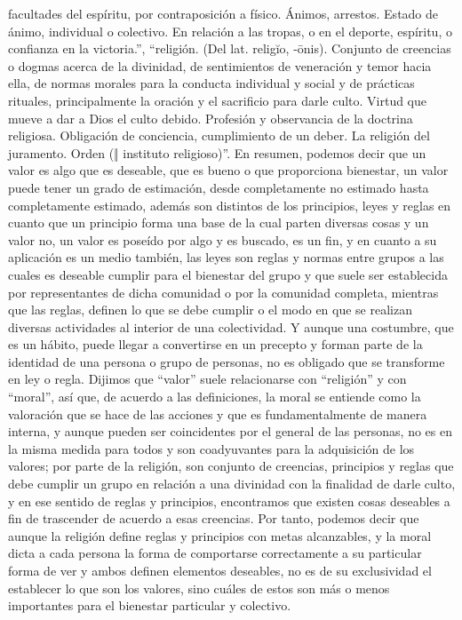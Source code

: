 facultades del espíritu, por contraposición a físico. Ánimos, arrestos. Estado de ánimo, individual o colectivo. En relación a las tropas, o en el deporte, espíritu, o confianza en la victoria.”, “religión. (Del lat. religĭo, -ōnis). Conjunto de creencias o dogmas acerca de la divinidad, de sentimientos de veneración y temor hacia ella, de normas morales para la conducta individual y social y de prácticas rituales, principalmente la oración y el sacrificio para darle culto. Virtud que mueve a dar a Dios el culto debido. Profesión y observancia de la doctrina religiosa. Obligación de conciencia, cumplimiento de un deber. La religión del juramento. Orden (‖ instituto religioso)”.
En resumen, podemos decir que un valor es algo que es deseable, que es bueno o que proporciona bienestar, un valor puede tener un grado de estimación, desde completamente no estimado hasta completamente estimado, además son distintos de los principios, leyes y reglas en cuanto que un principio forma una base de la cual parten diversas cosas y un valor no, un valor es poseído por algo y es buscado, es un fin, y en cuanto a su aplicación es un medio también, las leyes son reglas y normas entre grupos a las cuales es deseable cumplir para el bienestar del grupo y que suele ser establecida por representantes de dicha comunidad o por la comunidad completa, mientras que las reglas, definen lo que se debe cumplir o el modo en que se realizan diversas actividades al interior de una colectividad. Y aunque una costumbre, que es un hábito, puede llegar a convertirse en un precepto y forman parte de la identidad de una persona o grupo de personas, no es obligado que se transforme en ley o regla. Dijimos que “valor” suele relacionarse con “religión” y con “moral”, así que, de acuerdo a las definiciones, la moral se entiende como la valoración que se hace de las acciones y que es fundamentalmente de manera interna, y aunque pueden ser coincidentes por el general de las personas, no es en la misma medida para todos y son coadyuvantes para la adquisición de los valores; por parte de la religión, son conjunto de creencias, principios y reglas que debe cumplir un grupo en relación a una divinidad con la finalidad de darle culto, y en ese sentido de reglas y principios, encontramos que existen cosas deseables a fin de trascender de acuerdo a esas creencias. Por tanto, podemos decir que aunque la religión define reglas y principios con metas alcanzables, y la moral dicta a cada persona la forma de comportarse correctamente a su particular forma de ver y ambos definen elementos deseables, no es de su exclusividad el establecer lo que son los valores, sino cuáles de estos son más o menos importantes para el bienestar particular y colectivo.
